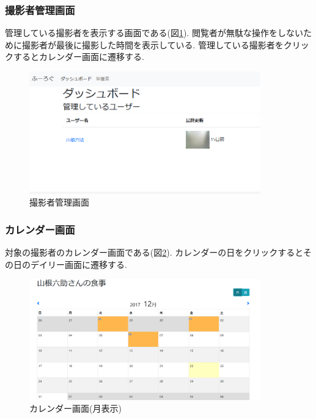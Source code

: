 \documentclass[../report]{subfiles}
\begin{document}
\subsubsection{撮影者管理画面}
管理している撮影者を表示する画面である(図\ref{fig:5_dashboard}).
閲覧者が無駄な操作をしないために撮影者が最後に撮影した時間を表示している.
管理している撮影者をクリックするとカレンダー画面に遷移する.
\begin{figure}[htbp]
    \begin{center}
        \includegraphics[width=10cm]{imgs/5_dashboard.png}
        \caption{撮影者管理画面}
        \label{fig:5_dashboard}
    \end{center}
\end{figure}

\subsubsection{カレンダー画面}
対象の撮影者のカレンダー画面である(図\ref{fig:calendar-month}).
カレンダーの日をクリックするとその日のデイリー画面に遷移する.

\begin{figure}[htbp]
    \begin{center}
        \includegraphics[width=10cm]{imgs/5_month.png}
        \caption{カレンダー画面(月表示)}
        \label{fig:calendar-month}
    \end{center}
\end{figure}
\end{document}
